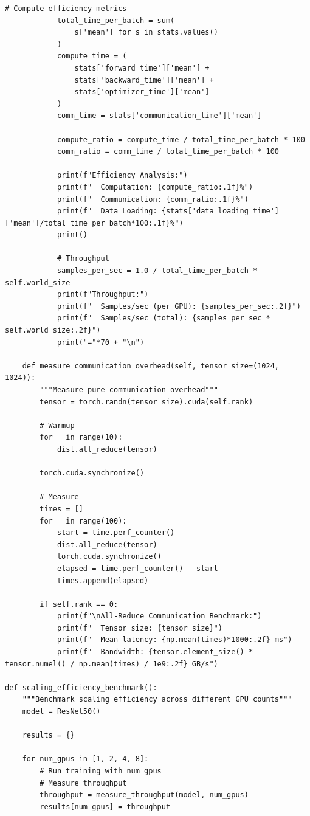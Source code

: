 \begin{lstlisting}[style=python, caption=Comprehensive performance benchmarking]
            # Compute efficiency metrics
            total_time_per_batch = sum(
                s['mean'] for s in stats.values()
            )
            compute_time = (
                stats['forward_time']['mean'] +
                stats['backward_time']['mean'] +
                stats['optimizer_time']['mean']
            )
            comm_time = stats['communication_time']['mean']

            compute_ratio = compute_time / total_time_per_batch * 100
            comm_ratio = comm_time / total_time_per_batch * 100

            print(f"Efficiency Analysis:")
            print(f"  Computation: {compute_ratio:.1f}%")
            print(f"  Communication: {comm_ratio:.1f}%")
            print(f"  Data Loading: {stats['data_loading_time']['mean']/total_time_per_batch*100:.1f}%")
            print()

            # Throughput
            samples_per_sec = 1.0 / total_time_per_batch * self.world_size
            print(f"Throughput:")
            print(f"  Samples/sec (per GPU): {samples_per_sec:.2f}")
            print(f"  Samples/sec (total): {samples_per_sec * self.world_size:.2f}")
            print("="*70 + "\n")

    def measure_communication_overhead(self, tensor_size=(1024, 1024)):
        """Measure pure communication overhead"""
        tensor = torch.randn(tensor_size).cuda(self.rank)

        # Warmup
        for _ in range(10):
            dist.all_reduce(tensor)

        torch.cuda.synchronize()

        # Measure
        times = []
        for _ in range(100):
            start = time.perf_counter()
            dist.all_reduce(tensor)
            torch.cuda.synchronize()
            elapsed = time.perf_counter() - start
            times.append(elapsed)

        if self.rank == 0:
            print(f"\nAll-Reduce Communication Benchmark:")
            print(f"  Tensor size: {tensor_size}")
            print(f"  Mean latency: {np.mean(times)*1000:.2f} ms")
            print(f"  Bandwidth: {tensor.element_size() * tensor.numel() / np.mean(times) / 1e9:.2f} GB/s")

def scaling_efficiency_benchmark():
    """Benchmark scaling efficiency across different GPU counts"""
    model = ResNet50()

    results = {}

    for num_gpus in [1, 2, 4, 8]:
        # Run training with num_gpus
        # Measure throughput
        throughput = measure_throughput(model, num_gpus)
        results[num_gpus] = throughput


\end{lstlisting}
